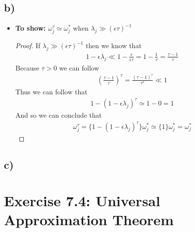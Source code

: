 \documentclass[a4paper]{article}
\begin{document}
    \subsection*{b)}
        \begin{itemize}
            \item \textbf{To show:} $\omega^{\tau}_j \simeq \omega^*_j$ when $\lambda_j \gg (\epsilon\tau)^{-1}$
            \begin{proof}
                If $\lambda_j \gg (\epsilon\tau)^{-1}$ then we know that
                    \begin{align}
                        1-\epsilon\lambda_j \ll 1-\frac{\epsilon}{\epsilon\tau} = 1-\frac{1}{\tau} = \frac{\tau-1}{\tau}
                    \end{align}
                Because $\tau > 0$ we can follow
                    \begin{align}
                        \left(\frac{\tau-1}{\tau}\right)^{\tau} = \frac{(\tau-1)^{\tau}}{\tau^{\tau}} \ll 1
                    \end{align}
                Thus we can follow that
                    \begin{align}
                        1-(1-\epsilon\lambda_j)^{\tau} \simeq 1-0 = 1
                    \end{align}
                And so we can conclude that
                    \begin{align}
                        \omega^{\tau}_j = \{1 - (1 - \epsilon\lambda_j)^{\tau}\} \omega^{*}_j 
                        \simeq \{1\} \omega^{*}_j = \omega^*_j
                    \end{align}
            \end{proof}
            
        \end{itemize}
    
    \subsection*{c)}



\newpage
\section*{Exercise 7.4: Universal Approximation Theorem}
\end{document}
